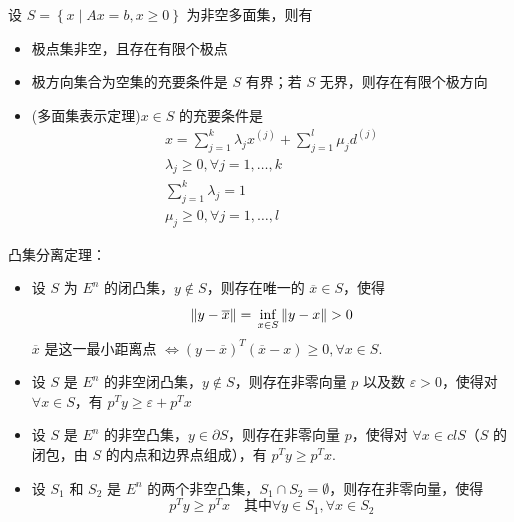 \begin{remark}
    设 $S = \left\{x \mid Ax = b, x \ge 0\right\}$ 为非空多面集，则有
    \begin{itemize}
        \item 极点集非空，且存在有限个极点
        \item 极方向集合为空集的充要条件是 $S$ 有界；若 $S$ 无界，则存在有限个极方向
        \item (多面集表示定理)$x \in S$ 的充要条件是 \begin{gather*}
            x = \sum_{j = 1}^k \lambda_j x^{(j)} + \sum_{j = 1}^l \mu_j d^{(j)}\\
            \lambda_j \ge 0, \forall j = 1, \dots, k\\
            \sum_{j = 1}^k \lambda_j = 1\\
            \mu_j \ge 0, \forall j = 1, \dots, l
        \end{gather*}
    \end{itemize}
\end{remark}

\begin{remark}
    凸集分离定理：
    \begin{itemize}
        \item 设 $S$ 为 $E^n$ 的闭凸集，$y\notin S$，则存在唯一的 $\overline{x} \in S$，使得\[ \|y - \overline{x}\| = \sideset{}{}{\operatorname{inf}}_{x \in S}\|y - x\| > 0 \]
        $\overline{x}$ 是这一最小距离点 $\Leftrightarrow (y - \overline{x})^T(\overline{x} - x) \ge 0, \forall x \in S$.

        \item 设 $S$ 是 $E^n$ 的非空闭凸集，$y\notin S$，则存在非零向量 $p$ 以及数 $\varepsilon > 0$，使得对 $\forall x \in S$，有 $p^T y \ge \varepsilon + p^T x$
        
        \item 设 $S$ 是 $E^n$ 的非空凸集，$y\in \partial S$，则存在非零向量 $p$，使得对 $\forall x \in clS$（$S$ 的闭包，由 $S$ 的内点和边界点组成），有 $p^Ty \ge p^Tx$.
        
        \item 设 $S_1$ 和 $S_2$ 是 $E^n$ 的两个非空凸集，$S_1 \cap S_2 = \emptyset$，则存在非零向量，使得\[p^Ty \ge p^T x \quad \text{其中}\forall y \in S_1, \forall x \in S_2\]
    \end{itemize}
\end{remark}


